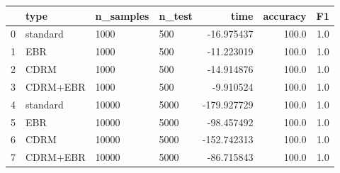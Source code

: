\begin{tabular}{llllrrr}
\toprule
{} &      type & n\_samples & n\_test &        time &  accuracy &   F1 \\
\midrule
0 &  standard &      1000 &    500 &  -16.975437 &     100.0 &  1.0 \\
1 &       EBR &      1000 &    500 &  -11.223019 &     100.0 &  1.0 \\
2 &      CDRM &      1000 &    500 &  -14.914876 &     100.0 &  1.0 \\
3 &  CDRM+EBR &      1000 &    500 &   -9.910524 &     100.0 &  1.0 \\
4 &  standard &     10000 &   5000 & -179.927729 &     100.0 &  1.0 \\
5 &       EBR &     10000 &   5000 &  -98.457492 &     100.0 &  1.0 \\
6 &      CDRM &     10000 &   5000 & -152.742313 &     100.0 &  1.0 \\
7 &  CDRM+EBR &     10000 &   5000 &  -86.715843 &     100.0 &  1.0 \\
\bottomrule
\end{tabular}

